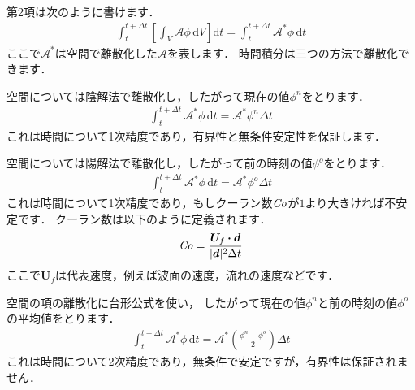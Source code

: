 第2項は次のように書けます．
\begin{align}
 \label{eq:2.32}
 \int_{t}^{t + \Delta t}\left[\int_{V}\mathcal{A}\phi\,\mathrm{d}V\right]\mathrm{d}t
 = \int_{t}^{t + \Delta t}\mathcal{A}^{*}\phi\,\mathrm{d}t
\end{align}
ここで$\mathcal{A}^{*}$は空間で離散化した$\mathcal{A}$を表します．
時間積分は三つの方法で離散化できます．
\begin{description}
%
%
 \item[オイラー陰解法] 空間については陰解法で離散化し，したがって現在の値$\phi^{n}$をとります．
            \begin{align}
             \label{eq:2.33}
             \int_{t}^{t + \Delta t}\mathcal{A}^{*}\phi\,\mathrm{d}t
             = \mathcal{A}^{*}\phi^{n}\Delta t
            \end{align}
            これは時間について1次精度であり，有界性と無条件安定性を保証します．
%
%
 \item[陽解法] 空間については陽解法で離散化し，したがって前の時刻の値$\phi^{o}$をとります．
            \begin{align}
             \label{eq:2.34}
             \int_{t}^{t + \Delta t}\mathcal{A}^{*}\phi\,\mathrm{d}t
             = \mathcal{A}^{*}\phi^{o}\Delta t
            \end{align}
            これは時間について1次精度であり，もしクーラン数$\mathord{\mathit{Co}}$が$1$より大きければ不安定です．
%
            クーラン数は以下のように定義されます．
            \begin{align}
             \label{eq:2.35}
             \nCo = \frac{\bm{U}_{f} \inProd \bm{d}}{|\bm{d}|^{2}\Delta t}
            \end{align}
            ここで$\bm{U}_{f}$は代表速度，例えば波面の速度，流れの速度などです．
%
%
 \item[クランク・ニコルソン法]
            空間の項の離散化に台形公式を使い，
            したがって現在の値$\phi^{n}$と前の時刻の値$\phi^{o}$の平均値をとります．
            \begin{align}
             \label{eq:2.36}
             \int_{t}^{t + \Delta t}\mathcal{A}^{*}\phi\,\mathrm{d}t
             = \mathcal{A}^{*}\left(\frac{\phi^{n} + \phi^{o}}{2}\right)\Delta t
            \end{align}
            これは時間について2次精度であり，無条件で安定ですが，有界性は保証されません．
\end{description}


